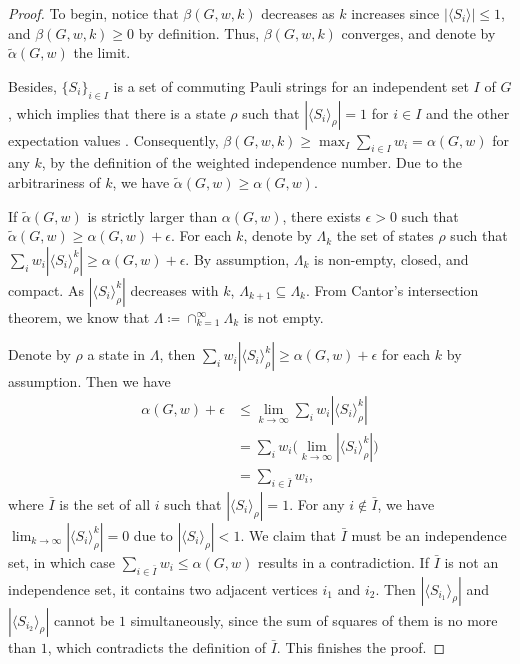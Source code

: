 \begin{proof}
To begin, notice that $\beta(G,w,k)$ decreases as $k$ increases since $|\langle S_i\rangle|\le 1$, and $\beta(G,w,k) \ge 0$ by definition.
Thus, $\beta(G,w,k)$ converges, and denote by $\tilde{\alpha}(G,w)$ the limit. 

Besides, $\{S_i\}_{i\in I}$ is a set of commuting Pauli strings for an independent set $I$ of $G$, which implies that there is a state $\rho$ such that $|\langle S_i\rangle_\rho| = 1$ for $i\in I$ and the other expectation values . Consequently, $\beta(G,w,k)\ge \max_{I} \sum_{i\in I} w_i = \alpha(G,w)$ for any $k$, by the definition of the weighted independence number. Due to the arbitrariness of $k$, we have $\tilde{\alpha}(G,w) \ge \alpha(G,w)$.

If  $\tilde{\alpha}(G,w)$ is strictly larger than $\alpha(G,w)$, there exists $\epsilon > 0$ such that $\tilde{\alpha}(G,w) \ge \alpha(G,w) + \epsilon$.
For each $k$, denote by $\Lambda_k$ the set of states $\rho$ such that $\sum_i w_i |\langle S_i\rangle^k_\rho| \ge \alpha(G,w)+\epsilon$. By assumption, $\Lambda_k$ is non-empty, closed, and compact. As $|\langle S_i\rangle^k_\rho|$ decreases with $k$, $\Lambda_{k+1} \subseteq \Lambda_k$.
From Cantor's intersection theorem, we know that $\Lambda \coloneqq \cap_{k=1}^\infty \Lambda_k$ is not empty. 

Denote by $\rho$ a state in $\Lambda$, then $\sum_i w_i |\langle S_i\rangle^k_\rho| \ge \alpha(G,w)+\epsilon$ for each $k$ by assumption. Then we have 
\begin{equation}
\begin{aligned}
	\alpha(G,w)+\epsilon & \le
	\lim_{k\to \infty} \sum\nolimits_i w_i |\langle S_i\rangle^k_\rho|\\
			     &= \sum\nolimits_i w_i \big(\lim_{k\to\infty} |\langle S_i\rangle^k_\rho|\big) \\
			     &=\sum\nolimits_{i\in \bar{I}} w_i,
\end{aligned}
\end{equation}
where $\bar{I}$ is the set of all $i$ such that $|\langle S_i\rangle_\rho|=1$. For any $i\not\in \bar{I}$, we have $\lim_{k\to\infty} |\langle S_i\rangle^k_\rho| = 0$ due to $|\langle S_i\rangle_\rho| < 1$.
We claim that $\bar{I}$ must be an independence set, in which case $\sum_{i\in \bar{I}} w_i \le \alpha(G,w)$ results in a contradiction. If $\bar{I}$ is not an independence set, it contains two adjacent vertices $i_1$ and $i_2$. Then $|\langle S_{i_1}\rangle_\rho|$ and  $|\langle S_{i_2}\rangle_\rho|$ cannot be $1$ simultaneously, since the sum of squares of them is no more than $1$, which contradicts the definition of $\bar{I}$. This finishes the proof.
\end{proof}
